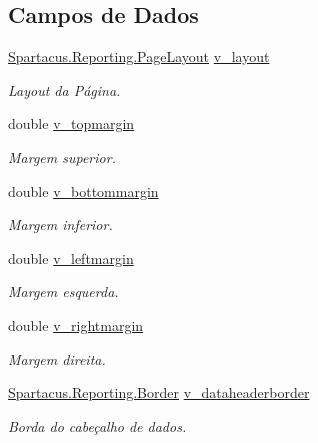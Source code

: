 \subsection*{Campos de Dados}
\begin{DoxyCompactItemize}
\item 
\hyperlink{namespaceSpartacus_1_1Reporting_a5e056b0c6896c4426cb938d08c5acb34}{Spartacus.\+Reporting.\+Page\+Layout} \hyperlink{classSpartacus_1_1Reporting_1_1Settings_a55c832d586adf0db9234b74d5e90aa07}{v\+\_\+layout}
\begin{DoxyCompactList}\small\item\em Layout da Página. \end{DoxyCompactList}\item 
double \hyperlink{classSpartacus_1_1Reporting_1_1Settings_a7e12c1140d9c7606183d906f411ac21b}{v\+\_\+topmargin}
\begin{DoxyCompactList}\small\item\em Margem superior. \end{DoxyCompactList}\item 
double \hyperlink{classSpartacus_1_1Reporting_1_1Settings_a8b16deb1009bf4504da7d08fe03fad2a}{v\+\_\+bottommargin}
\begin{DoxyCompactList}\small\item\em Margem inferior. \end{DoxyCompactList}\item 
double \hyperlink{classSpartacus_1_1Reporting_1_1Settings_a2ed14e7216df5440f880d0338fe7cf2f}{v\+\_\+leftmargin}
\begin{DoxyCompactList}\small\item\em Margem esquerda. \end{DoxyCompactList}\item 
double \hyperlink{classSpartacus_1_1Reporting_1_1Settings_a86b8086f2ccdc7020c22208e7a9a8f54}{v\+\_\+rightmargin}
\begin{DoxyCompactList}\small\item\em Margem direita. \end{DoxyCompactList}\item 
\hyperlink{classSpartacus_1_1Reporting_1_1Border}{Spartacus.\+Reporting.\+Border} \hyperlink{classSpartacus_1_1Reporting_1_1Settings_a3502118af991852d946564a6ec3e4dfe}{v\+\_\+dataheaderborder}
\begin{DoxyCompactList}\small\item\em Borda do cabeçalho de dados. \end{DoxyCompactList}\item 

\end{DoxyCompactItemize}
